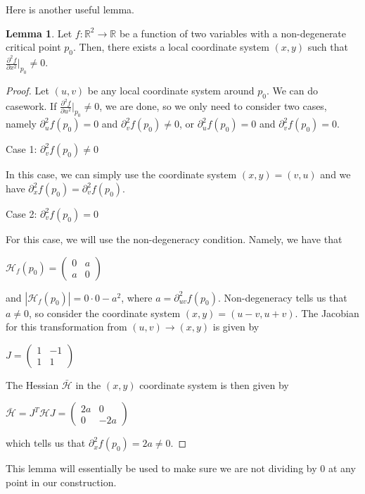 \documentclass[12pt]{article}
\newcommand{\cH}{{\mathcal H}}
\newcommand{\bR}{{\mathbb R}}
\theoremstyle{definition}
\newtheorem{lemma}{Lemma}
\begin{document}
Here is another useful lemma. 

\begin{lemma}
	Let $f:\bR^2 \rightarrow \bR$ be a function of two variables with a non-degenerate critical point $p_0$. Then, there exists a local coordinate system $(x,y)$ such that $\frac{\partial^2 f}{\partial x^2}|_{p_0} \neq 0$. 
\end{lemma}

\begin{proof}
	Let $(u,v)$ be any local coordinate system around $p_0$. We can do casework. If $\frac{\partial^2 f}{\partial u^2}|_{p_0} \neq 0$, we are done, so we only need to consider two cases, namely $\partial_u^2f(p_0) = 0$ and $\partial_v^2 f(p_0)\neq 0$, or $\partial_u^2f(p_0) = 0$ and $\partial_v^2 f(p_0) = 0$. 

	Case 1: $\partial_v^2 f(p_0)\neq 0$

	In this case, we can simply use the coordinate system $(x,y) = (v,u)$ and we have $\partial_x^2f(p_0) = \partial_v^2f(p_0)$. 

	Case 2: $\partial_v^2f(p_0) =0$

	For this case, we will use the non-degeneracy condition. Namely, we have that 
	\begin{center}
		$\cH_f(p_0) = \begin{pmatrix}
			0 & a  \\
			a & 0 
			\end{pmatrix}$
	\end{center}
	and $|\cH_f(p_0)| = 0\cdot 0 - a^2$, where $a = \partial_{uv}^2f(p_0)$. Non-degeneracy tells us that $a \neq 0$, so consider the coordinate system $(x,y) = (u-v,u+v)$. The Jacobian for this transformation from $(u,v) \rightarrow (x,y)$ is given by 
	\begin{center}
		$J = \begin{pmatrix}
			1 & -1  \\
			1 & 1 
			\end{pmatrix}$
	\end{center}
	The Hessian $\bar{\cH}$ in the $(x,y)$ coordinate system is then given by 
	\begin{center}
		$\bar{\cH} = J^T \cH J = \begin{pmatrix}
			2a & 0  \\
			0 & -2a 
			\end{pmatrix}$
	\end{center}
	which tells us that $\partial_x^2f(p_0) = 2a \neq 0$. 
\end{proof}
This lemma will essentially be used to make sure we are not dividing by 0 at any point in our construction. 
\end{document}
